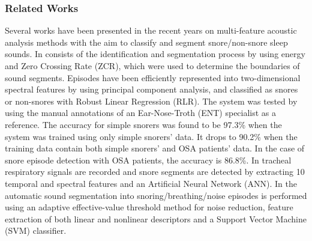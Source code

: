 \subsubsection{Related Works}

Several works have been presented in the recent years on multi-feature acoustic analysis methods with the aim to classify and segment snore/non-snore sleep sounds.
In \cite{cavusoglu2007efficient}  consists of the identification and segmentation process by using energy and Zero Crossing Rate (ZCR), which were used to determine the boundaries of sound segments. Episodes have been efficiently represented into two-dimensional spectral features by using principal component analysis, and classified as snores or non-snores with Robust Linear Regression (RLR). The system was tested by using the manual annotations of an Ear-Nose-Troth (ENT) specialist as a reference. The accuracy for simple snorers was found to be 97.3\% when the system was trained using only simple snorers' data. It drops to 90.2\% when the training data contain both simple snorers’ and OSA patients' data. In the case of snore episode detection with OSA patients, the accuracy is 86.8\%. 
In \cite{shokrollahi2016snoring} tracheal respiratory signals are recorded and snore segments are detected by extracting 10 temporal and spectral features and an Artificial Neural Network (ANN). In \cite{wang2016automatic} the automatic sound segmentation into snoring/breathing/noise episodes is performed using an adaptive effective-value threshold method for noise reduction, feature extraction of both linear and nonlinear descriptors and a Support Vector Machine (SVM) classifier.

